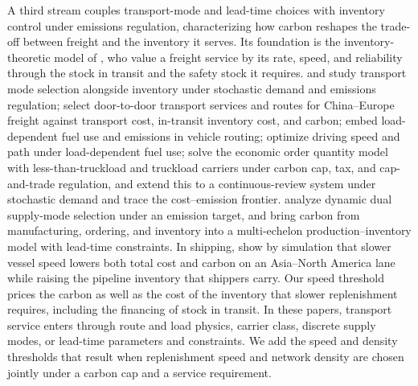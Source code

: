 \documentclass[11pt]{article}
\numberwithin{proposition}{section}
\theoremstyle{definition}
\theoremstyle{remark}
\theoremstyle{plain}
\begin{document}
A third stream couples transport-mode and lead-time choices with inventory control under emissions regulation,
characterizing how carbon reshapes the trade-off between freight and the inventory it serves. Its foundation is
the inventory-theoretic model of \citet{baumol1970inventory}, who value a freight service by its rate, speed, and
reliability through the stock in transit and the safety stock it requires.
\citet{hoen2014effect} and \citet{chen2016effects} study transport mode selection alongside
inventory under stochastic demand and emissions regulation; \citet{qi2022transport} select door-to-door transport
services and routes for China--Europe freight against transport cost, in-transit inventory cost, and carbon; \citet{bektas2011pollution} embed load-dependent fuel use and emissions in vehicle routing; \citet{moradi2025load} optimize driving speed and path
under load-dependent fuel use; \citet{konur2014integrated} solve the economic
order quantity model with less-than-truckload and truckload carriers under carbon cap, tax, and cap-and-trade
regulation, and \citet{schaefer2015economic} extend this to a continuous-review system under stochastic demand and trace the
cost--emission frontier. \citet{drent2023efficient} analyze dynamic dual supply-mode selection under an emission target,
and \citet{hammami2015carbon} bring carbon from manufacturing, ordering, and inventory into a multi-echelon
production--inventory model with lead-time constraints. In shipping, \citet{maloni2013slow} show by simulation
that slower vessel speed lowers both total cost and carbon on an Asia--North America lane while raising the pipeline inventory that shippers carry. Our speed threshold prices the carbon as well as the cost of
the inventory that slower replenishment requires, including the financing of stock in transit. In these papers,
transport service enters through route and load physics, carrier class, discrete supply modes, or lead-time
parameters and constraints. We add the speed and density thresholds that result when replenishment speed and
network density are chosen jointly under a carbon cap and a service requirement.
\end{document}
